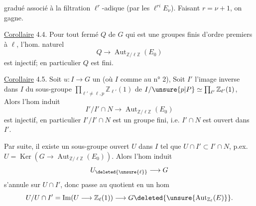 gradué associé à la filtration $\ell^r$-adique (par les $\ell^{ri}E_\nu$). Faisant $r=\nu+1$, on gagne.

\uline{Corollaire} 4.4. Pour tout  fermé $Q$ de $G$ qui est une  groupes finis d'ordre premiers à $\ell$,  l'hom. naturel
\[
Q\longrightarrow\operatorname{Aut}_{\mathbb Z/\ell\mathbb Z}(E_0)
\]
est injectif; en particulier $Q$ est fini.

\uline{Corollaire} 4.5. Soit $u:I\longrightarrow G$ un    (où $I$ comme au n° 2),   Soit $I'$  l'image inverse dans $I$ du sous-groupe $\prod_{\ell'\ne\ell,p}\mathbb Z_{\ell'}(1)$ de $I/\unsure{p|P}\simeq\prod_{\ell'}\mathbb Z_{\ell'}(1)$,  Alors l'hom induit
\[
I'/I'\cap N\longrightarrow\operatorname{Aut}_{\mathbb Z/\ell\mathbb Z}(E_0)
\]
est injectif, en particulier $I'/I'\cap N$ est un groupe fini, i.e. $I'\cap N$ est ouvert dans $I'$.

Par suite, il existe un  sous-groupe ouvert $U$ dans $I$ tel que $U\cap I'\subset I'\cap N$, p.ex.  $U=\operatorname{Ker}(G\longrightarrow\operatorname{Aut}_{\mathbb Z/\ell\mathbb Z}(E_0))$. Alors l'hom induit
\[
U_{\deleted{\unsure{\ell}}}\longrightarrow G
\]
s'annule sur $U\cap I'$, donc passe au quotient en un hom
\[
U/U\cap I'=\operatorname{Im}(U\longrightarrow\mathbb Z_\ell(1))\longrightarrow G\deleted{\unsure{\operatorname{Aut}_{\mathbb Z_\ell}(E)}}.
\]
